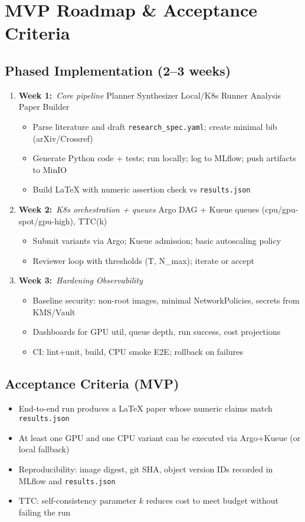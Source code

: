 \section{MVP Roadmap \& Acceptance Criteria}
\subsection*{Phased Implementation (2–3 weeks)}
\begin{enumerate}[leftmargin=1.4em]
  \item \textbf{Week 1:}\ \emph{Core pipeline}\; Planner \Rightarrow Synthesizer \Rightarrow Local/K8s Runner \Rightarrow Analysis \Rightarrow Paper Builder
    \begin{itemize}
      \item Parse literature and draft \texttt{research\_spec.yaml}; create minimal bib (arXiv/Crossref)
      \item Generate Python code + tests; run locally; log to MLflow; push artifacts to MinIO
      \item Build LaTeX with numeric assertion check vs \texttt{results.json}
    \end{itemize}
  \item \textbf{Week 2:}\ \emph{K8s orchestration + queues}\; Argo DAG + Kueue queues (cpu/gpu-spot/gpu-high), TTC(k)
    \begin{itemize}
      \item Submit variants via Argo; Kueue admission; basic autoscaling policy
      \item Reviewer loop with thresholds (T, N\_max); iterate or accept
    \end{itemize}
  \item \textbf{Week 3:}\ \emph{Hardening \/ Observability}
    \begin{itemize}
      \item Baseline security: non-root images, minimal NetworkPolicies, secrets from KMS/Vault
      \item Dashboards for GPU util, queue depth, run success, cost projections
      \item CI: lint+unit, build, CPU smoke E2E; rollback on failures
    \end{itemize}
\end{enumerate}
\subsection*{Acceptance Criteria (MVP)}
\begin{itemize}[leftmargin=1.4em]
  \item End-to-end run produces a LaTeX paper whose numeric claims match \texttt{results.json}
  \item At least one GPU and one CPU variant can be executed via Argo+Kueue (or local fallback)
  \item Reproducibility: image digest, git SHA, object version IDs recorded in MLflow and \texttt{results.json}
  \item TTC: self-consistency parameter \(k\) reduces cost to meet budget without failing the run
\end{itemize}

